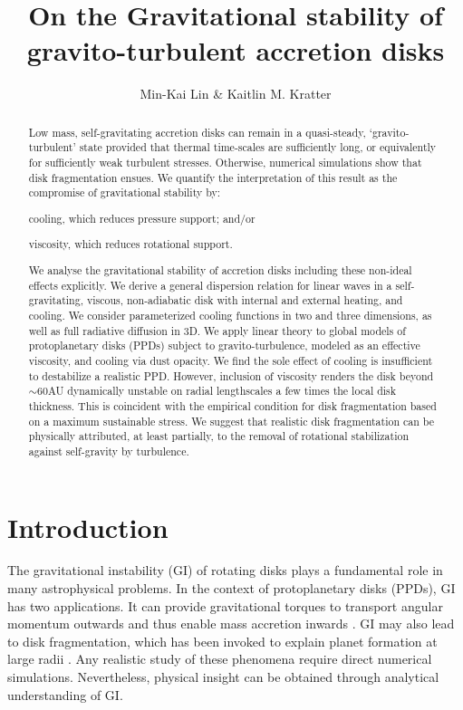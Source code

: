 \documentclass[iop, numberedappendix]{emulateapj}
\begin{document}
\title{On the Gravitational stability of gravito-turbulent accretion disks}
\author{Min-Kai Lin \& Kaitlin M. Kratter}

\begin{abstract}
 Low mass, self-gravitating accretion disks can remain in a  
quasi-steady, `gravito-turbulent' state provided that thermal 
time-scales are sufficiently long, or equivalently for sufficiently
weak turbulent stresses. Otherwise, numerical simulations show that
disk fragmentation ensues. 
We quantify the interpretation of this result as the
compromise of gravitational stability by: 
\begin{inparaenum}[1)] 
\item 
cooling, which reduces pressure support; and/or
\item 
viscosity, which reduces rotational support. 
\end{inparaenum}
We analyse the gravitational stability of accretion disks
including these non-ideal effects explicitly.   
We derive a general dispersion relation for linear waves in a 
self-gravitating, viscous, non-adiabatic disk with internal and
external heating, and cooling. We 
consider parameterized cooling functions in two and three dimensions,
as well as full radiative diffusion in 3D. 
We apply linear theory to 
global models of protoplanetary disks (PPDs) subject to gravito-turbulence, modeled as an effective
viscosity, and cooling via dust opacity. We find the sole effect of cooling is insufficient to
destabilize a realistic PPD. However, inclusion of viscosity renders
the disk beyond $\sim 60$AU dynamically unstable on radial 
lengthscales a few times the local disk thickness. This is coincident 
with the empirical condition for disk fragmentation based on a
maximum sustainable stress. We suggest that realistic disk fragmentation can be
physically attributed,  
at least partially, to the removal of rotational stabilization against
self-gravity by turbulence.   
\end{abstract}



\section{Introduction}\label{intro} 
The gravitational instability (GI) of rotating disks   
plays a fundamental role in many astrophysical problems. In the context of 
protoplanetary disks (PPDs), GI has two applications. It can 
provide gravitational torques to transport angular momentum outwards
and thus enable mass accretion inwards \citep{armitage10,turner14}.   
GI may also lead to disk fragmentation, which has been invoked to explain planet formation at
large radii \citep{helled14}. Any realistic study of these phenomena require direct
numerical simulations. Nevertheless, physical insight can be  
obtained through analytical understanding of GI.  %
\end{document}
